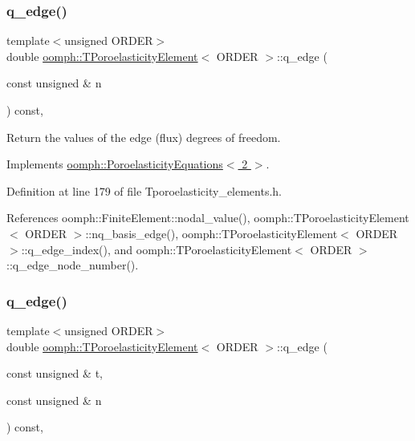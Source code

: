 \subsubsection{\texorpdfstring{q\+\_\+edge()}{q\_edge()}\hspace{0.1cm}{\footnotesize\ttfamily [1/2]}}
{\footnotesize\ttfamily template$<$unsigned O\+R\+D\+ER$>$ \\
double \hyperlink{classoomph_1_1TPoroelasticityElement}{oomph\+::\+T\+Poroelasticity\+Element}$<$ O\+R\+D\+ER $>$\+::q\+\_\+edge (\begin{DoxyParamCaption}\item[{const unsigned \&}]{n }\end{DoxyParamCaption}) const\hspace{0.3cm}{\ttfamily [inline]}, {\ttfamily [virtual]}}



Return the values of the edge (flux) degrees of freedom. 



Implements \hyperlink{classoomph_1_1PoroelasticityEquations_a67d1df907b555608c1692efdd278a5d7}{oomph\+::\+Poroelasticity\+Equations$<$ 2 $>$}.



Definition at line 179 of file Tporoelasticity\+\_\+elements.\+h.



References oomph\+::\+Finite\+Element\+::nodal\+\_\+value(), oomph\+::\+T\+Poroelasticity\+Element$<$ O\+R\+D\+E\+R $>$\+::nq\+\_\+basis\+\_\+edge(), oomph\+::\+T\+Poroelasticity\+Element$<$ O\+R\+D\+E\+R $>$\+::q\+\_\+edge\+\_\+index(), and oomph\+::\+T\+Poroelasticity\+Element$<$ O\+R\+D\+E\+R $>$\+::q\+\_\+edge\+\_\+node\+\_\+number().

\mbox{\label{classoomph_1_1TPoroelasticityElement_aafc2bfff42ab8d5e6b6c4759e2929f81}} 
\subsubsection{\texorpdfstring{q\+\_\+edge()}{q\_edge()}\hspace{0.1cm}{\footnotesize\ttfamily [2/2]}}
{\footnotesize\ttfamily template$<$unsigned O\+R\+D\+ER$>$ \\
double \hyperlink{classoomph_1_1TPoroelasticityElement}{oomph\+::\+T\+Poroelasticity\+Element}$<$ O\+R\+D\+ER $>$\+::q\+\_\+edge (\begin{DoxyParamCaption}\item[{const unsigned \&}]{t,  }\item[{const unsigned \&}]{n }\end{DoxyParamCaption}) const\hspace{0.3cm}{\ttfamily [inline]}, {\ttfamily [virtual]}}



